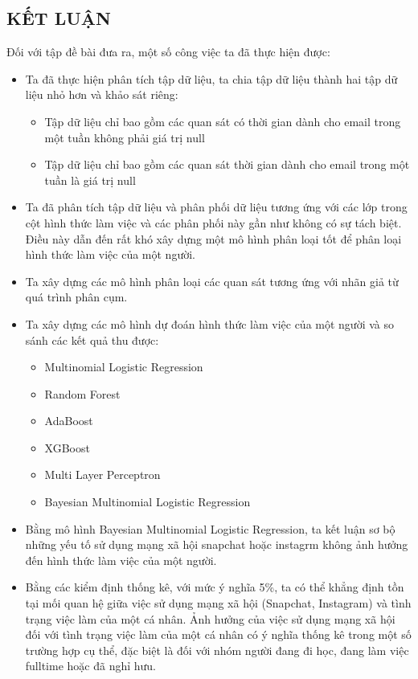 \newpage
\begin{center}
    \section*{KẾT LUẬN}
\end{center}

Đối với tập đề bài đưa ra, một số công việc ta đã thực hiện được:

\begin{itemize}
    \item Ta đã thực hiện phân tích tập dữ liệu, ta chia tập dữ liệu thành hai tập dữ liệu nhỏ hơn và khảo sát riêng:
    
    \begin{itemize}
        \item Tập dữ liệu chỉ bao gồm các quan sát có thời gian dành cho email trong một tuần không phải giá trị null
        \item Tập dữ liệu chỉ bao gồm các quan sát thời gian dành cho email trong một tuần là giá trị null
    \end{itemize}

    \item Ta đã phân tích tập dữ liệu và phân phối dữ liệu tương ứng với các lớp trong cột hình thức làm việc và các phân phối này gần như không có sự tách biệt.
    Điều này dẫn đến rất khó xây dựng một mô hình phân loại tốt để phân loại hình thức làm việc của một người.
    \item Ta xây dựng các mô hình phân loại các quan sát tương ứng với nhãn giả từ quá trình phân cụm.
    \item Ta xây dựng các mô hình dự đoán hình thức làm việc của một người và so sánh các kết quả thu được:
    \begin{itemize}
        \item Multinomial Logistic Regression
        \item Random Forest
        \item AdaBoost
        \item XGBoost
        \item Multi Layer Perceptron
        \item Bayesian Multinomial Logistic Regression
    \end{itemize}
    \item Bằng mô hình Bayesian Multinomial Logistic Regression, ta kết luận sơ bộ những yếu tố sử dụng mạng xã hội snapchat hoặc instagrm không ảnh hưởng đến hình thức làm việc của một người.
    \item Bằng các kiểm định thống kê, với mức ý nghĩa 5\%, ta có thể khẳng định tồn tại mối quan hệ giữa việc sử dụng mạng xã hội (Snapchat, Instagram) và tình trạng việc làm của một cá nhân. Ảnh hưởng của việc sử dụng mạng xã hội đối với tình trạng việc làm của một cá nhân có ý nghĩa thống kê trong một số trường hợp cụ thể, đặc biệt là đối với nhóm người đang đi học, đang làm việc fulltime hoặc đã nghỉ hưu.
\end{itemize}






